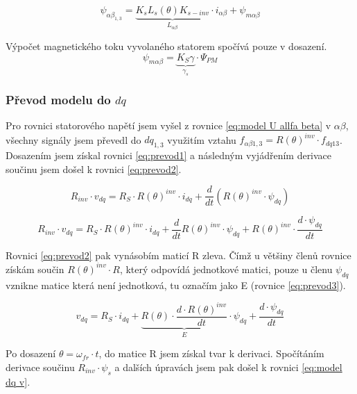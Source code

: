 \begin{equation}
    \label{eq:flux alfa beta}
    \psi_{\alpha \beta_{1,3}}=
    \underbrace{K_sL_s(\theta)K_{s-inv}}_{L_{\alpha \beta}} \cdot i_{\alpha \beta}+ \psi_{m \alpha \beta}
\end{equation}


Výpočet magnetického toku vyvolaného statorem spočívá pouze v dosazení.
\begin{equation}
    \label{eq:model rotorflux alfa beta}
    \psi_{m \alpha \beta}=\underbrace{K_S\gamma}_{\gamma_{s}} \cdot \Psi_{PM}
\end{equation}

\subsubsection{Převod modelu do \texorpdfstring{$dq$}{dq}}


Pro rovnici statorového napětí jsem vyšel z rovnice \ref{eq:model U allfa beta} v $\alpha \beta$, všechny signály jsem převedl do $dq_{1,3}$ využitím vztahu $f_{\alpha \beta 1,3} = R(\theta)^{inv} \cdot f_{dq13}$. Dosazením jsem získal rovnici \ref{eq:prevod1} a následným vyjádřením derivace součinu jsem došel k rovnici \ref{eq:prevod2}.


\begin{equation}
    \label{eq:prevod1}
    R_{inv} \cdot v_{dq}= R_S \cdot R(\theta)^{inv} \cdot i_{dq} + \frac{d}{dt} (R(\theta)^{inv} \cdot \psi_{dq}) 
\end{equation}


\begin{equation}
\label{eq:prevod2}
    R_{inv} \cdot v_{dq}= R_S \cdot R(\theta)^{inv} \cdot i_{dq} + \frac{d}{dt} R(\theta)^{inv} \cdot \psi_{dq} +  R(\theta)^{inv} \cdot \frac{d \cdot\psi_{dq}}{dt} 
\end{equation}

Rovnici \ref{eq:prevod2} pak vynásobím maticí R zleva. Čímž u většiny členů rovnice  získám  součin $R(\theta)^{inv} \cdot R $, který odpovídá jednotkové matici, pouze u členu $\psi_{dq}$ vznikne matice která není jednotková, tu označím jako E (rovnice \ref{eq:prevod3}). 

\begin{equation}
    \label{eq:prevod3}
    v_{dq}= R_S \cdot i_{dq} + \underbrace { R(\theta) \cdot \frac{d\cdot R(\theta)^{inv}}{dt}}_E  \cdot \psi_{dq} +  \frac{d \cdot\psi_{dq}}{dt} 
\end{equation}

Po dosazení $\theta=\omega_{fr}\cdot t$, do matice R jsem získal tvar k derivaci. Spočítáním derivace součinu $R_{inv} \cdot \psi_s$ a dalších úpravách jsem pak došel k rovnici \ref{eq:model dq v}. 

